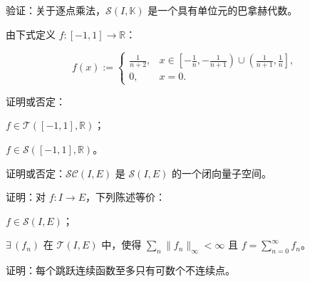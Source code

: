 \begin{exercises}
\item

验证：关于逐点乘法，$ \mathcal{S}(I, \mathbb{K}) $ 是一个具有单位元的巴拿赫代数。

\item

由下式定义 $ f : [-1, 1] \to \mathbb{R} $：

\begin{equation*}
f(x) := \begin{cases} \frac{1}{n+2}, & x \in \left[ -\frac{1}{n}, -\frac{1}{n+1} \right) \cup \left( \frac{1}{n+1}, \frac{1}{n} \right], \\ 0, & x = 0. \end{cases}
\end{equation*}

证明或否定：

\begin{items}
\item

$ f \in \mathcal{T}([-1, 1], \mathbb{R}) $；

\item

$ f \in \mathcal{S}([-1, 1], \mathbb{R}) $。

\end{items}

\item

证明或否定：$ \mathcal{SC}(I, E) $ 是 $ \mathcal{S}(I, E) $ 的一个闭向量子空间。

\item

证明：对 $ f : I \to E $，下列陈述等价：

\begin{subitems}
\item

$ f \in \mathcal{S}(I, E) $；

\item

$ \exists\, (f_n) $ 在 $ \mathcal{T}(I, E) $ 中，使得 $ \sum_n \|f_n\|_\infty < \infty $ 且 $ f = \sum_{n=0}^\infty f_n $。

\end{subitems}

\item

证明：每个跳跃连续函数至多只有可数个不连续点。

\item


\end{exercises}
